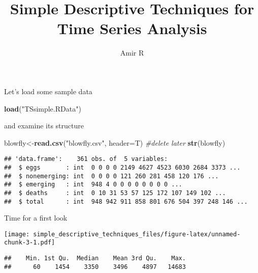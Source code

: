 \documentclass[]{article}
\title{Simple Descriptive Techniques for Time Series Analysis}
\author{Amir R}
\date{}
\newenvironment{Shaded}{\begin{snugshade}}{\end{snugshade}}
\newcommand{\CommentTok}[1]{\textcolor[rgb]{0.56,0.35,0.01}{\textit{#1}}}
\newcommand{\DataTypeTok}[1]{\textcolor[rgb]{0.13,0.29,0.53}{#1}}
\newcommand{\KeywordTok}[1]{\textcolor[rgb]{0.13,0.29,0.53}{\textbf{#1}}}
\newcommand{\NormalTok}[1]{#1}
\newcommand{\OperatorTok}[1]{\textcolor[rgb]{0.81,0.36,0.00}{\textbf{#1}}}
\newcommand{\StringTok}[1]{\textcolor[rgb]{0.31,0.60,0.02}{#1}}
\begin{document}
\maketitle

Let's load some sample data

\begin{Shaded}
\begin{Highlighting}[]
\KeywordTok{load}\NormalTok{(}\StringTok{"TSsimple.RData"}\NormalTok{)}
\end{Highlighting}
\end{Shaded}

and examine its structure

\begin{Shaded}
\begin{Highlighting}[]
\NormalTok{blowfly<-}\KeywordTok{read.csv}\NormalTok{(}\StringTok{"blowfly.csv"}\NormalTok{, }\DataTypeTok{header=}\NormalTok{T) }\CommentTok{#delete later}
\KeywordTok{str}\NormalTok{(blowfly)}
\end{Highlighting}
\end{Shaded}

\begin{verbatim}
## 'data.frame':    361 obs. of  5 variables:
##  $ eggs       : int  0 0 0 0 2149 4627 4523 6030 2684 3373 ...
##  $ nonemerging: int  0 0 0 0 121 260 281 458 120 176 ...
##  $ emerging   : int  948 4 0 0 0 0 0 0 0 0 ...
##  $ deaths     : int  0 10 31 53 57 125 172 107 149 102 ...
##  $ total      : int  948 942 911 858 801 676 504 397 248 146 ...
\end{verbatim}

Time for a first look

\begin{Shaded}
\end{Shaded}

\texttt{[image: simple\_descriptive\_techniques\_files/figure-latex/unnamed-chunk-3-1.pdf]}

\begin{Shaded}
\end{Shaded}

\begin{verbatim}
##    Min. 1st Qu.  Median    Mean 3rd Qu.    Max. 
##      60    1454    3350    3496    4897   14683
\end{verbatim}
\end{document}

